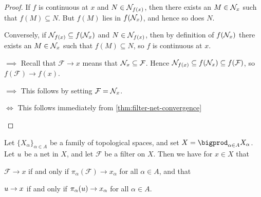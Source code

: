 \documentclass[article, a4paper, 11pt, oneside]{memoir}
\numberwithin{equation}{chapter}
\newcommand{\calF}{\mathcal{F}}
\theoremstyle{nonumberplain}
\begin{document}
\begin{proof}
    If $f$ is continuous at $x$ and $N \in \mathcal{N}_{f(x)}$, then there exists an $M \in \mathcal{N}_{x}$ such that $f(M) \subseteq N$. But $f(M)$ lies in $f(\mathcal{N}_{x})$, and hence so does $N$.

    Conversely, if $\mathcal{N}_{f(x)} \subseteq f(\mathcal{N}_{x})$ and $N \in \mathcal{N}_{f(x)}$, then by definition of $f(\mathcal{N}_{x})$ there exists an $M \in \mathcal{N}_{x}$ such that $f(M) \subseteq N$, so $f$ is continuous at $x$.
%
\begin{proofsec}
    
    \item[\subcref{enum:continuity-point} $\implies$ \subcref{enum:filter-convergence-point}]
    Recall that $\calF \to x$ means that $\nhoods{x} \subseteq \calF$. Hence $\nhoods{f(x)} \subseteq f(\nhoods{x}) \subseteq f(\calF)$, so $f(\calF) \to f(x)$.

    \item[\subcref{enum:filter-convergence-point} $\implies$ \subcref{enum:continuity-point}]
    This follows by setting $\calF = \nhoods{x}$.

    \item[\subcref{enum:filter-convergence-point} $\Leftrightarrow$ \subcref{enum:net-convergence-point}]
    This follows immediately from \cref{thm:filter-net-convergence}
\end{proofsec}
\end{proof}


\begin{proposition}
    Let $\{X_\alpha\}_{\alpha \in A}$ be a family of topological spaces, and set $X = \bigprod_{\alpha \in A} X_\alpha$. Let $u$ be a net in $X$, and let $\calF$ be a filter on $X$. Then we have for $x \in X$ that
    \begin{enumprop}
        \item \label{enum:product-filter-convergence} $\calF \to x$ if and only if $\pi_\alpha(\calF) \to x_\alpha$ for all $\alpha \in A$, and that
        \item \label{enum:product-net-convergence} $u \to x$ if and only if $\pi_\alpha(u) \to x_\alpha$ for all $\alpha \in A$.
    \end{enumprop}
\end{proposition}
\end{document}
